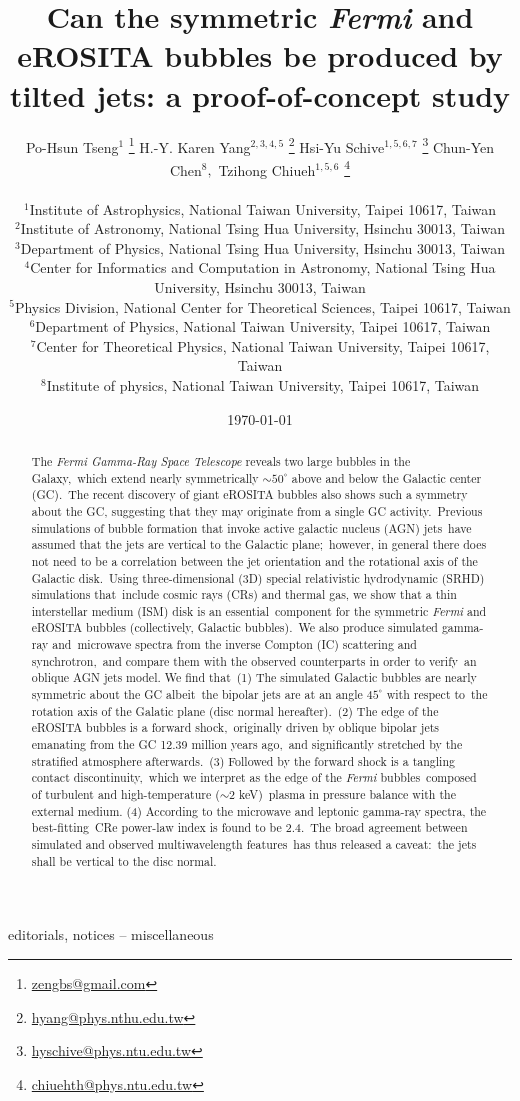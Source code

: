 \documentclass[fleqn,usenatbib,useAMS]{mnras}
\title[]{Can the symmetric \textit{Fermi} and eROSITA bubbles be produced by tilted jets: a proof-of-concept study}
\author[P. H. Tseng et al.]{\large
Po-Hsun Tseng$^{1}$%
\thanks{\href{mailto:zengbs@gmail.com}{zengbs@gmail.com}}%
\orcidlink{https://orcid.org/0000-0002-1868-0660}%
\quad H.-Y. Karen Yang$^{2,3,4,5}$%
\thanks{\href{mailto:hyang@phys.nthu.edu.tw}{hyang@phys.nthu.edu.tw}}%
\orcidlink{https://orcid.org/0000-0003-3269-4660}%
\quad Hsi-Yu Schive$^{1,5,6,7}$%
\thanks{\href{mailto:hyschive@phys.ntu.edu.tw}{hyschive@phys.ntu.edu.tw}}%
\orcidlink{https://orcid.org/0000-0002-1249-279X}%
\quad Chun-Yen Chen$^{8}, $
\quad Tzihong Chiueh$^{1,5,6}$%
\thanks{\href{mailto:chiuehth@phys.ntu.edu.tw}{chiuehth@phys.ntu.edu.tw}}%
\orcidlink{https://orcid.org/0000-0003-2654-8763}%
\\\\
$^{1}$Institute of Astrophysics, National Taiwan University, Taipei 10617, Taiwan\\
$^{2}$Institute of Astronomy, National Tsing Hua University, Hsinchu 30013, Taiwan\\
$^{3}$Department of Physics, National Tsing Hua University, Hsinchu 30013, Taiwan\\
$^{4}$Center for Informatics and Computation in Astronomy, National Tsing Hua University, Hsinchu 30013, Taiwan\\
$^{5}$Physics Division, National Center for Theoretical Sciences, Taipei 10617, Taiwan\\
$^{6}$Department of Physics, National Taiwan University, Taipei 10617, Taiwan\\
$^{7}$Center for Theoretical Physics, National Taiwan University, Taipei 10617, Taiwan\\
$^{8}$Institute of physics, National Taiwan University, Taipei 10617, Taiwan\\
}
\date{\today}
\begin{document}
\label{firstpage}
\pagerange{\pageref{firstpage}--\pageref{lastpage}}
\maketitle

\begin{abstract}
The \textit{Fermi Gamma-Ray Space Telescope} reveals two large bubbles in the Galaxy,\
which extend nearly symmetrically $\sim50^{\circ}$ above and below the Galactic center (GC).\
The recent discovery of giant eROSITA bubbles also shows such a symmetry about the GC, suggesting that they may originate from a single GC activity.\
Previous simulations of bubble formation that invoke active galactic nucleus (AGN) jets\
have assumed that the jets are vertical to the Galactic plane;\
however, in general there does not need to be a correlation between the jet orientation and the rotational axis of the Galactic disk.\
Using three-dimensional (3D) special relativistic hydrodynamic (SRHD) simulations that\
include cosmic rays (CRs) and thermal gas, we show that a thin interstellar medium (ISM) disk is an essential\
component for the symmetric \textit{Fermi} and eROSITA bubbles (collectively, Galactic bubbles).\
We also produce simulated gamma-ray and\
microwave spectra from the inverse Compton (IC) scattering and synchrotron,\
and compare them with the observed counterparts in order to verify\
an oblique AGN jets model. We find that\
(1) The simulated Galactic bubbles are nearly symmetric about the GC albeit\
the bipolar jets are at an angle $45^{\circ}$ with respect to\
the rotation axis of the Galatic plane (disc normal hereafter).\
(2) The edge of the eROSITA bubbles is a forward shock,\
originally driven by oblique bipolar jets emanating from the GC 12.39 million years ago,\
and significantly stretched by the stratified atmosphere afterwards.\
(3) Followed by the forward shock is a tangling contact discontinuity,\
which we interpret as the edge of the \textit{Fermi} bubbles\
composed of turbulent and high-temperature ($\sim2$ keV)\
plasma in pressure balance with the external medium.
(4) According to the microwave and leptonic gamma-ray spectra, the best-fitting\
CRe power-law index is found to be 2.4.\
The broad agreement between simulated and observed multiwavelength features\
has thus released a caveat:\
the jets shall be vertical to the disc normal.
\end{abstract}

\begin{keywords}
editorials, notices -- miscellaneous
\end{keywords}
\end{document}
